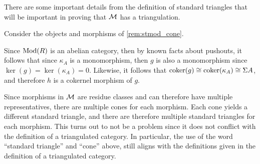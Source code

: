 There are some important details from the definition of standard triangles that will be important in proving that \( {\mathcal{M}} \) has a triangulation.

\begin{remark}
    \label{rem:stmod_cone_pushout_properties}
    Consider the objects and morphisms of \autoref{rem:stmod_cone}.

    Since \( \operatorname{Mod}(R) \) is an abelian category, then by known facts about pushouts, it follows that since \( \kappa_A \) is a monomorphism, then \( g \) is also a monomorphism since \( \ker(g) = \ker(\kappa_A) = 0 \). Likewise, it follows that \( \operatorname{coker}(g) \cong \operatorname{coker}(\kappa_A) \cong \Sigma A \), and therefore \( h \) is a cokernel morphism of \( g \).
\end{remark}

Since morphisms in \( {\mathcal{M}} \) are residue classes and can therefore have multiple representatives, there are multiple cones for each morphism. Each cone yields a different standard triangle, and there are therefore multiple standard triangles for each morphism. This turns out to not be a problem since it does not conflict with the definition of a triangulated category. In particular, the use of the word ``standard triangle'' and ``cone'' above, still aligns with the definitions given in the definition of a triangulated category.

